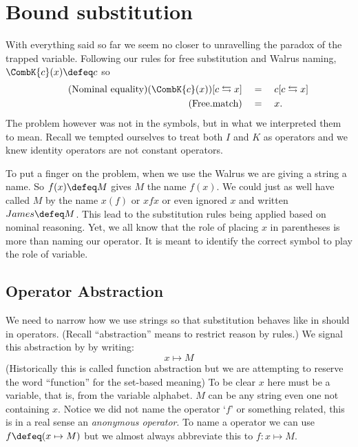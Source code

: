 \section{Bound substitution}
With everything said so far we seem no closer to unravelling the paradox 
of the trapped variable.  Following our rules for free substitution and 
Walrus naming, $\CombK{c}(x)\defeq c$ so 
\begin{align*}
    \tag{Nominal equality}
    (\CombK{c}(x))[c\leftrightarrows x] 
    &\quad =\quad c[c\leftrightarrows x]\\
    \tag{Free.match}
    & \quad =\quad x.
\end{align*}
The problem however was not in the symbols, but in what we interpreted them 
to mean.  Recall we tempted ourselves to treat both $I$ and $K$ as operators
and we knew identity operators are not constant operators.

To put a finger on the problem, when we use the Walrus we are giving 
a string a name.  So $f(x)\defeq M$ gives $M$ the name $f(x)$.  
We could just as well have called $M$ by the name $x(f)$ or $xfx$ or 
even ignored $x$ and written $James\defeq M$.  This lead to the substitution 
rules being applied based on nominal reasoning.  Yet, we all know that 
the role of placing $x$ in parentheses is more than naming our operator.
It is meant to identify the correct symbol to play the role of variable.


\subsection{Operator Abstraction}
We need to narrow how we use strings so that substitution behaves 
like in should in operators.  (Recall ``abstraction'' means to restrict reason by rules.)
We signal this abstraction by by writing:
\begin{equation}
    \tag{Operator Abstraction}
    x  \mapsto M
\end{equation}
(Historically this is called function abstraction but we are 
attempting to reserve the word ``function'' for the set-based meaning)
To be clear $x$ here must be a variable, that is, from the variable 
alphabet.  $M$ can be any string even one not containing $x$.
Notice we did not  name the operator `$f$' or something related, 
this is in a real sense an \emph{anonymous operator}.  To 
name a operator we can use $f\defeq (x\mapsto M)$ 
but we almost always abbreviate this to $f:x\mapsto M$.

